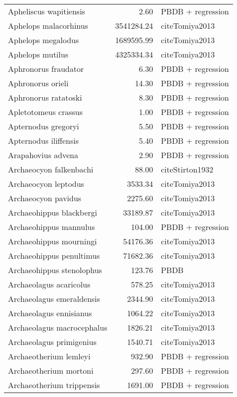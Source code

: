 \begin{table}[ht]
\begin{tabular}{lrl}
  Apheliscus wapitiensis & 2.60 & PBDB + regression \\ 
  Aphelops malacorhinus & 3541284.24 & cite{Tomiya2013} \\ 
  Aphelops megalodus & 1689595.99 & cite{Tomiya2013} \\ 
  Aphelops mutilus & 4325334.34 & cite{Tomiya2013} \\ 
  Aphronorus fraudator & 6.30 & PBDB + regression \\ 
  Aphronorus orieli & 14.30 & PBDB + regression \\ 
  Aphronorus ratatoski & 8.30 & PBDB + regression \\ 
  Apletotomeus crassus & 1.00 & PBDB + regression \\ 
  Apternodus gregoryi & 5.50 & PBDB + regression \\ 
  Apternodus iliffensis & 5.40 & PBDB + regression \\ 
  Arapahovius advena & 2.90 & PBDB + regression \\ 
  Archaeocyon falkenbachi & 88.00 & cite{Stirton1932} \\ 
  Archaeocyon leptodus & 3533.34 & cite{Tomiya2013} \\ 
  Archaeocyon pavidus & 2275.60 & cite{Tomiya2013} \\ 
  Archaeohippus blackbergi & 33189.87 & cite{Tomiya2013} \\ 
  Archaeohippus mannulus & 104.00 & PBDB + regression \\ 
  Archaeohippus mourningi & 54176.36 & cite{Tomiya2013} \\ 
  Archaeohippus penultimus & 71682.36 & cite{Tomiya2013} \\ 
  Archaeohippus stenolophus & 123.76 & PBDB \\ 
  Archaeolagus acaricolus & 578.25 & cite{Tomiya2013} \\ 
  Archaeolagus emeraldensis & 2344.90 & cite{Tomiya2013} \\ 
  Archaeolagus ennisianus & 1064.22 & cite{Tomiya2013} \\ 
  Archaeolagus macrocephalus & 1826.21 & cite{Tomiya2013} \\ 
  Archaeolagus primigenius & 1540.71 & cite{Tomiya2013} \\ 
  Archaeotherium lemleyi & 932.90 & PBDB + regression \\ 
  Archaeotherium mortoni & 297.60 & PBDB + regression \\ 
  Archaeotherium trippensis & 1691.00 & PBDB + regression \\ 

\end{tabular}
\end{table}
